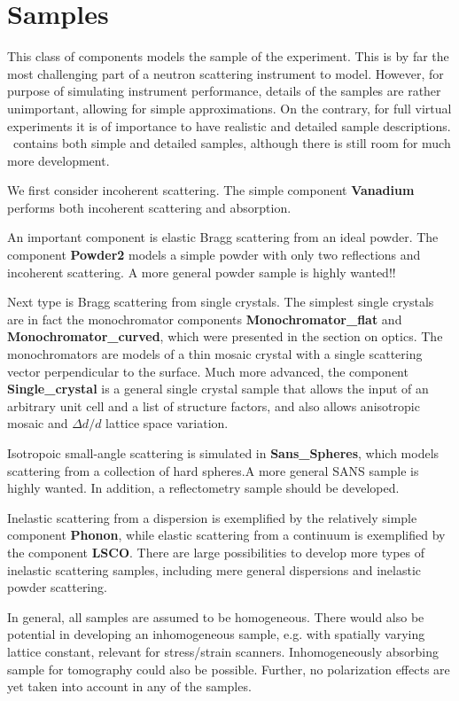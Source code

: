 
\chapter{Samples}

This class of components models the sample of the experiment.
This is by far the most challenging part of a neutron scattering
instrument to model. However, for purpose of simulating 
instrument performance, details of the samples are rather unimportant, 
allowing for simple approximations. On the contrary, for full
virtual experiments it is of importance to have realistic and 
detailed sample descriptions. \MCS\ contains both simple and detailed
samples, although there is still room for much more development.

We first consider incoherent scattering. The simple component {\bf Vanadium}
performs both incoherent scattering and absorption.

An important component is elastic Bragg scattering from an ideal powder.
The component {\bf Powder2} models a simple powder with only two
reflections and incoherent scattering. A more general powder sample is
highly wanted!!

Next type is Bragg scattering from single crystals. 
The simplest single crystals are in fact the monochromator components
{\bf Monochromator\_flat} and {\bf Monochromator\_curved},
which were presented in the section on optics.
The monochromators are models of a thin mosaic crystal 
with a single scattering vector perpendicular to the surface. 
Much more advanced, the component {\bf Single\_crystal} 
is a general single crystal sample that allows
the input of an arbitrary unit cell and a list of structure factors, and
also allows anisotropic mosaic and $\Delta d/d$ lattice space variation.

Isotropoic small-angle scattering is simulated in {\bf Sans\_Spheres},
which models scattering from a collection of hard spheres.A more general
SANS sample is highly wanted. In addition, a reflectometry sample
should be developed.

Inelastic scattering from a dispersion is exemplified by
the relatively simple component {\bf Phonon}, while elastic scattering
from a continuum is exemplified by the component {\bf LSCO}.
There are large possibilities to develop more types of inelastic
scattering samples, including mere general dispersions and inelastic powder
scattering.

In general, all samples are assumed to be homogeneous. There would also be
potential in developing an inhomogeneous sample, e.g. with
spatially varying lattice constant, relevant for stress/strain scanners.
Inhomogeneously absorbing sample for tomography could also be possible.
Further, no polarization effects are yet taken into account in any 
of the samples.  






%

